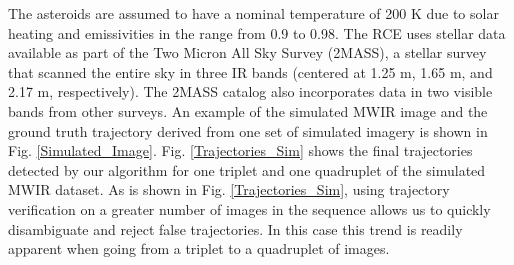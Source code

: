  
 The asteroids are assumed to have a nominal temperature of 200 K due to solar heating and emissivities in the range from 0.9 to 0.98. 
 The RCE uses stellar data available as part of the Two Micron All Sky Survey (2MASS), a stellar survey that scanned the entire sky in three IR bands (centered at 1.25 \textmu m, 1.65 \textmu m, and 2.17 \textmu m, respectively).  The 2MASS catalog also incorporates data in two visible bands from other surveys. 
 An example of the simulated MWIR image and the ground truth trajectory derived from one set of simulated imagery is shown in Fig. \ref{Simulated_Image}. 
 Fig. \ref{Trajectories_Sim} shows the final trajectories detected by our algorithm for one triplet and one quadruplet of the simulated MWIR dataset. As is shown in Fig. \ref{Trajectories_Sim}, using trajectory verification on a greater number of images in the sequence allows us to quickly disambiguate and reject false trajectories. In this case this trend is readily apparent when going from a triplet to a quadruplet of images.
%

